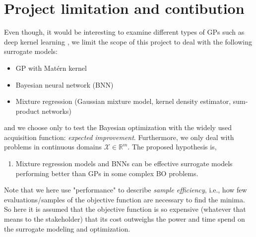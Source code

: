  \section{Project limitation and contibution}
Even though, it would be interesting to examine different types of GPs such as deep kernel
learning \cite{deepkernel}, we limit the scope of this project to deal with the following surrogate models:
\begin{itemize}[noitemsep]
    \item GP with Matérn kernel
    \item Bayesian neural network (BNN)
    \item Mixture regression (Gaussian mixture model, kernel density estimator, sum-product networks)
\end{itemize}
and we choose only to test the Bayesian optimization with the widely used acquisition function:
\textit{expected improvement}. Furthermore, we only deal with problems in continuous domains
$\mathcal{X} \in \mathbb{R}^m$. The proposed hypothesis is,

\begin{enumerate}[noitemsep]
    \item Mixture regression models and BNNs can be effective surrogate models
    performing better than GPs in some complex BO problems. 
\end{enumerate}

Note that we here use "performance" to describe \textit{sample efficiency}, i.e., how few evaluations/samples
of the objective function are necessary to find the minima. So here it is assumed that the objective
function is so expensive (whatever that means to the stakeholder) that its cost outweighs the power
and time spend on the surrogate modeling and optimization.


    


